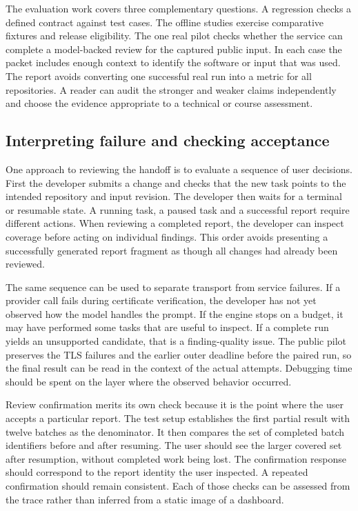 \documentclass[journal,compsoc]{IEEEtran}
\begin{document}
The evaluation work covers three complementary questions. A regression checks a defined contract against test cases. The offline studies exercise comparative fixtures and release eligibility. The one real pilot checks whether the service can complete a model-backed review for the captured public input. In each case the packet includes enough context to identify the software or input that was used. The report avoids converting one successful real run into a metric for all repositories. A reader can audit the stronger and weaker claims independently and choose the evidence appropriate to a technical or course assessment.


\subsection{Interpreting failure and checking acceptance}
One approach to reviewing the handoff is to evaluate a sequence of user decisions. First the developer submits a change and checks that the new task points to the intended repository and input revision. The developer then waits for a terminal or resumable state. A running task, a paused task and a successful report require different actions. When reviewing a completed report, the developer can inspect coverage before acting on individual findings. This order avoids presenting a successfully generated report fragment as though all changes had already been reviewed.

The same sequence can be used to separate transport from service failures. If a provider call fails during certificate verification, the developer has not yet observed how the model handles the prompt. If the engine stops on a budget, it may have performed some tasks that are useful to inspect. If a complete run yields an unsupported candidate, that is a finding-quality issue. The public pilot preserves the TLS failures and the earlier outer deadline before the paired run, so the final result can be read in the context of the actual attempts. Debugging time should be spent on the layer where the observed behavior occurred.

Review confirmation merits its own check because it is the point where the user accepts a particular report. The test setup establishes the first partial result with twelve batches as the denominator. It then compares the set of completed batch identifiers before and after resuming. The user should see the larger covered set after resumption, without completed work being lost. The confirmation response should correspond to the report identity the user inspected. A repeated confirmation should remain consistent. Each of those checks can be assessed from the trace rather than inferred from a static image of a dashboard.
\end{document}

